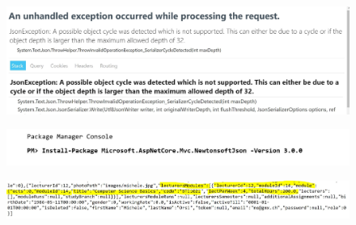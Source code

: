 \documentclass{scrartcl}
\begin{document}
\begin{figure}[H]
\centering
\includegraphics[width=150mm]{report_img/complex_data_problem/json_problem}
\caption{}
\label{blabla}
\end{figure}

\begin{figure}[H]
\centering
\includegraphics[width=150mm]{report_img/complex_data_problem/install_newtonsoft_json}
\caption{}
\label{blabla}
\end{figure}

\noindent                                                                %
\begin{minipage}{\linewidth}                            %
\label{visina8                                                      }%
\end{minipage}




\begin{figure}[H]
\centering
\includegraphics[width=150mm]{report_img/complex_data_problem/michele_module_ok}
\caption{}
\label{blabla}
\end{figure}
\end{document}
